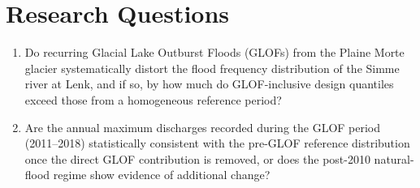 \section{Research Questions}
\label{sec:rq}

\begin{enumerate}
  \item Do recurring Glacial Lake Outburst Floods (GLOFs) from the Plaine Morte glacier
        systematically distort the flood frequency distribution of the Simme river at Lenk,
        and if so, by how much do GLOF-inclusive design quantiles exceed those from a
        homogeneous reference period?

  \item Are the annual maximum discharges recorded during the GLOF period (2011--2018)
        statistically consistent with the pre-GLOF reference distribution once the direct
        GLOF contribution is removed, or does the post-2010 natural-flood regime show
        evidence of additional change?
\end{enumerate}

